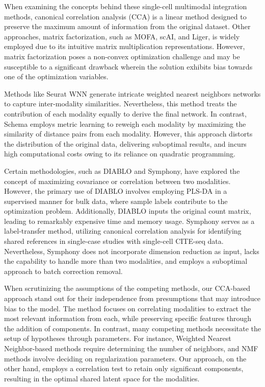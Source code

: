 When examining the concepts behind these single-cell multimodal integration methods, canonical correlation analysis (CCA) is a linear method designed to preserve the maximum amount of information from the original dataset. Other approaches, matrix factorization, such as MOFA, scAI, and Liger, is widely employed due to its intuitive matrix multiplication representations. However, matrix factorization poses a non-convex optimization challenge and may be susceptible to a significant drawback wherein the solution exhibits bias towards one of the optimization variables.

Methods like Seurat WNN generate intricate weighted nearest neighbors networks to capture inter-modality similarities. Nevertheless, this method treats the contribution of each modality equally to derive the final network. In contrast, Schema employs metric learning to reweigh each modality by maximizing the similarity of distance pairs from each modality. However, this approach distorts the distribution of the original data, delivering suboptimal results, and incurs high computational costs owing to its reliance on quadratic programming.

Certain methodologies, such as DIABLO and Symphony, have explored the concept of maximizing covariance or correlation between two modalities. However, the primary use of DIABLO involves employing PLS-DA in a supervised manner for bulk data, where sample labels contribute to the optimization problem. Additionally, DIABLO inputs the original count matrix, leading to remarkably expensive time and memory usage. Symphony serves as a label-transfer method, utilizing canonical correlation analysis for identifying shared references in single-case studies with single-cell CITE-seq data. Nevertheless, Symphony does not incorporate dimension reduction as input, lacks the capability to handle more than two modalities, and employs a suboptimal approach to batch correction removal.


When scrutinizing the assumptions of the competing methods, our CCA-based approach stand out for their independence from presumptions that may introduce bias to the model. The method focuses on correlating modalities to extract the most relevant information from each, while preserving specific features through the addition of components. In contrast, many competing methods necessitate the setup of hypotheses through parameters. For instance, Weighted Nearest Neighbor-based methods require determining the number of neighbors, and NMF methods involve deciding on regularization parameters. Our approach, on the other hand, employs a correlation test to retain only significant components, resulting in the optimal shared latent space for the modalities.



